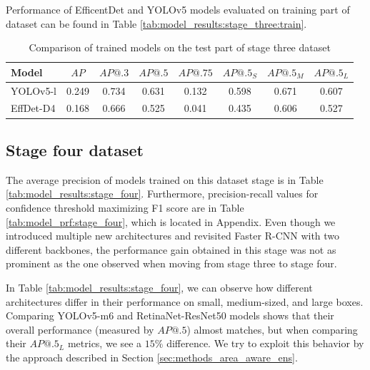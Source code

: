 Performance of EfficentDet and YOLOv5 models evaluated on training part of dataset can be found in Table \ref{tab:model_results:stage_three:train}.

\begin{table}[H]
    \centering
    \begin{tabular}{|l|c|c|c|c|c|c|c|}
        \hline
        Model     & $AP$  & $AP@.3$ & $AP@.5$ & $AP@.75$ & $AP@.5_S$ & $AP@.5_M$ & $AP@.5_L$ \\ \hline
        YOLOv5-l  & 0.249 & 0.734   & 0.631   & 0.132    & 0.598     & 0.671     & 0.607     \\ \hline
        EffDet-D4 & 0.168 & 0.666   & 0.525   & 0.041    & 0.435     & 0.606     & 0.527     \\ \hline
    \end{tabular}
    \caption{Comparison of trained models on the test part of stage three dataset}
    \label{tab:model_results:stage_three:test}
\end{table}

\subsection{Stage four dataset}
The average precision of models trained on this dataset stage is in Table \ref{tab:model_results:stage_four}. Furthermore, precision-recall values for confidence threshold maximizing F1 score are in Table \ref{tab:model_prf:stage_four}, which is located in Appendix. Even though we introduced multiple new architectures and revisited Faster R-CNN with two different backbones, the performance gain obtained in this stage was not as prominent as the one observed when moving from stage three to stage four.

In Table \ref{tab:model_results:stage_four}, we can observe how different architectures differ in their performance on small, medium-sized, and large boxes. Comparing YOLOv5-m6 and RetinaNet-ResNet50 models shows that their overall performance (measured by $AP@.5$) almost matches, but when comparing their $AP@.5_L$ metrics, we see a $15\%$ difference. We try to exploit this behavior by the approach described in Section \ref{sec:methods_area_aware_ens}.


